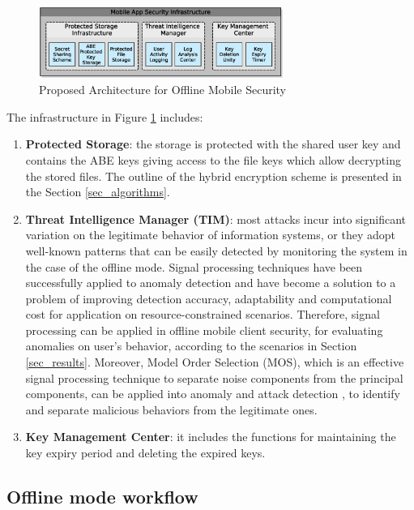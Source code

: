 \documentclass[twocolumn]{svjour3}          	%
\begin{document}
\begin{figure}[h!]
	\centering
	\includegraphics[width=8cm]{figures/offlinesecurityarchitecture.eps}
	\caption{Proposed Architecture for Offline Mobile Security }
	\label{fig:5}
\end{figure}

The infrastructure in Figure \ref{fig:5} includes:

\begin{enumerate}
	\item \textbf{Protected Storage}: the storage is protected with the shared user key and contains the ABE keys giving access to the file keys which allow decrypting the stored files. The outline of the hybrid encryption scheme is presented in the Section \ref{sec_algorithms}.
	\item \textbf{Threat Intelligence Manager (TIM)}: most attacks incur into significant variation on the legitimate behavior of information systems, or they adopt well-known patterns that can be easily detected by monitoring the system in the case of the offline mode. Signal processing techniques have been successfully applied to anomaly detection \cite{lu2009network, huang2009signal} and have become a solution to a problem of improving detection accuracy, adaptability and computational cost for application on resource-constrained scenarios. Therefore, signal processing can be applied in offline mobile client security, for evaluating anomalies on user's behavior, according to the scenarios in Section \ref{sec_results}. Moreover, Model Order Selection (MOS), which is an effective signal processing technique to separate noise components from the principal components, can be applied into anomaly and attack detection \cite{tenorio2013greatest}, to identify and separate malicious behaviors from the legitimate ones.
	\item \textbf{Key Management Center}: it includes the functions for maintaining the key expiry period and deleting the expired keys. 
\end{enumerate}

\subsection{Offline mode workflow}
\label{sec_offline_mode_workflow}
\end{document}
